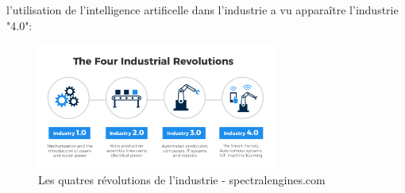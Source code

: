l'utilisation de l'intelligence artificelle dans l'industrie a vu apparaître 
l'industrie "4.0":

\begin{figure}[H]
    \centering
    \includegraphics[width=0.7\textwidth]{Images/industryfour}
    \caption{Les quatres révolutions de l'industrie - spectralengines.com}
	\label{fig:fourindustrialrevolutions}
\end{figure}

